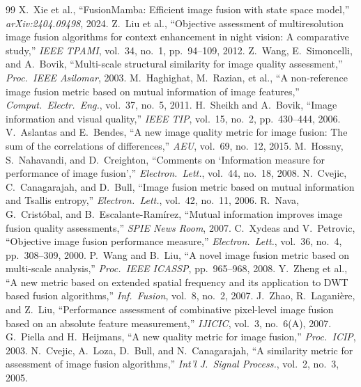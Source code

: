 \documentclass[a4paper,12pt]{article}
\begin{document}
\begin{thebibliography}{99}
 X.~Xie et al., ``FusionMamba: Efficient image fusion with state space model,'' \textit{arXiv:2404.09498}, 2024.
 Z.~Liu et al., ``Objective assessment of multiresolution image fusion algorithms for context enhancement in night vision: A comparative study,'' \textit{IEEE TPAMI}, vol.~34, no.~1, pp.~94--109, 2012.
 Z.~Wang, E.~Simoncelli, and A.~Bovik, ``Multi-scale structural similarity for image quality assessment,'' \textit{Proc.\ IEEE Asilomar}, 2003.
 M.~Haghighat, M.~Razian, et al., ``A non-reference image fusion metric based on mutual information of image features,'' \textit{Comput.\ Electr.\ Eng.}, vol.~37, no.~5, 2011.
 H.~Sheikh and A.~Bovik, ``Image information and visual quality,'' \textit{IEEE TIP}, vol.~15, no.~2, pp.~430--444, 2006.
 V.~Aslantas and E.~Bendes, ``A new image quality metric for image fusion: The sum of the correlations of differences,'' \textit{AEU}, vol.~69, no.~12, 2015.
 M.~Hossny, S.~Nahavandi, and D.~Creighton, ``Comments on `Information measure for performance of image fusion','' \textit{Electron.\ Lett.}, vol.~44, no.~18, 2008.
 N.~Cvejic, C.~Canagarajah, and D.~Bull, ``Image fusion metric based on mutual information and Tsallis entropy,'' \textit{Electron.\ Lett.}, vol.~42, no.~11, 2006.
 R.~Nava, G.~Crist\'{o}bal, and B.~Escalante-Ram\'{i}rez, ``Mutual information improves image fusion quality assessments,'' \textit{SPIE News Room}, 2007.
 C.~Xydeas and V.~Petrovic, ``Objective image fusion performance measure,'' \textit{Electron.\ Lett.}, vol.~36, no.~4, pp.~308--309, 2000.
 P.~Wang and B.~Liu, ``A novel image fusion metric based on multi-scale analysis,'' \textit{Proc.\ IEEE ICASSP}, pp.~965--968, 2008.
 Y.~Zheng et al., ``A new metric based on extended spatial frequency and its application to DWT based fusion algorithms,'' \textit{Inf.\ Fusion}, vol.~8, no.~2, 2007.
 J.~Zhao, R.~Lagani\`{e}re, and Z.~Liu, ``Performance assessment of combinative pixel-level image fusion based on an absolute feature measurement,'' \textit{IJICIC}, vol.~3, no.~6(A), 2007.
 G.~Piella and H.~Heijmans, ``A new quality metric for image fusion,'' \textit{Proc.\ ICIP}, 2003.
 N.~Cvejic, A.~Loza, D.~Bull, and N.~Canagarajah, ``A similarity metric for assessment of image fusion algorithms,'' \textit{Int'l J.\ Signal Process.}, vol.~2, no.~3, 2005.

\end{thebibliography}
\end{document}

